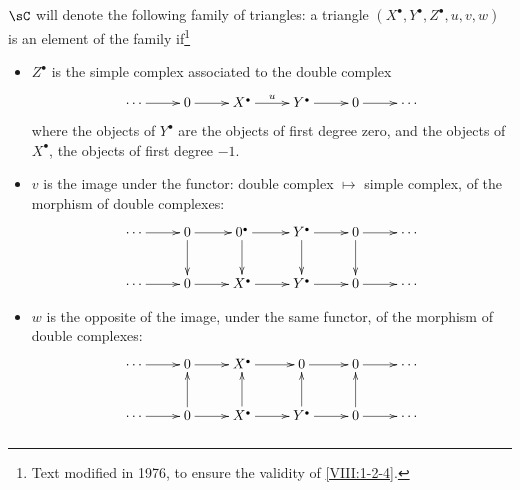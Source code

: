 $\sC$ will denote the following family of triangles: a triangle
$(X^\bullet,Y^\bullet,Z^\bullet,u,v,w)$ is an element of the family
if\footnote{Text modified in 1976, to ensure the validity of
\ref{VIII:1-2-4}.}
\begin{itemize}
  \item $Z^\bullet$ is the simple complex associated to the double complex 
    \[\xymatrix{
      \cdots \ar[r] 
        & 0 \ar[r] 
        & X^\bullet \ar[r]^-u 
        & Y^\bullet \ar[r] 
        & 0 \ar[r] 
        & \cdots 
    }\]
    where the objects of $Y^\bullet$ are the objects of first degree zero,
    and the objects of $X^\bullet$, the objects of first degree $-1$.
  \item $v$ is the image under the functor: double complex $\mapsto$ simple
    complex, of the morphism of double complexes: 
    \[\xymatrix{
      \cdots \ar[r] 
        & 0 \ar[r] \ar[d] 
        & 0^\bullet \ar[r] \ar[d] 
        & Y^\bullet \ar[r] \ar[d] 
        & 0 \ar[r] \ar[d] 
        & \cdots \\
      \cdots \ar[r] 
        & 0 \ar[r] 
        & X^\bullet \ar[r] 
        & Y^\bullet \ar[r] 
        & 0 \ar[r] 
        & \cdots 
    }\]
  \item $w$ is the opposite of the image, under the same functor, of the morphism of
    double complexes: 
    \[\xymatrix{
      \cdots \ar[r] 
        & 0 \ar[r] 
        & X^\bullet \ar[r] 
        & 0 \ar[r] 
        & 0 \ar[r] 
        & \cdots \\
      \cdots  \ar[r] 
        & 0 \ar[r] \ar[u] 
        & X^\bullet \ar[r] \ar[u] 
        & Y^\bullet \ar[r] \ar[u] 
        & 0 \ar[r] \ar[u] 
        & \cdots 
    }\]
\end{itemize}





\subsubsection{}\label{VIII:1-2-2}

